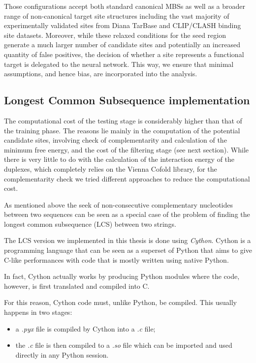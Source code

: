 Those configurations accept both standard canonical MBSs as well as a broader
range of non-canonical target site structures including the vast majority of experimentally validated sites from Diana TarBase and CLIP/CLASH binding site
datasets. Moreover, while these relaxed conditions for the seed region generate a much larger number of candidate sites and potentially an increased quantity of false positives, the decision of whether a site represents a functional target is delegated to the neural network. This way, we ensure that minimal assumptions, and hence bias, are incorporated into the analysis. 

\subsection{Longest Common Subsequence implementation}
The computational cost of the testing stage is considerably higher than that of the  training phase. The reasons lie mainly in the computation of the potential candidate sites, involving check of complementarity and calculation of the minimum free energy, and the cost of the filtering stage (see next section).    
While there is very little to do with the calculation of the interaction energy of the duplexes, which completely relies on the Vienna Cofold library, for the complementarity check we tried different approaches to reduce the computational cost.

As mentioned above the seek of non-consecutive complementary nucleotides between two sequences can be seen as a special case of the problem of finding the longest common subsequence (LCS) between two strings. 

The LCS version we implemented in this thesis is done using \emph{Cython}\cite{cython}. Cython is a programming language that can be seen as a superset of Python that aims to give C-like performances with code that is mostly written using native Python. 

In fact, Cython actually works by producing Python modules where the code, however, is first translated and compiled into C.

For this reason, Cython code must, unlike Python, be compiled. This usually happens in two stages: 

\begin{itemize}
	\item a \emph{.pyx} file is compiled by Cython into a \emph{.c} file;
	\item the \emph{.c} file is then compiled to a \emph{.so} file which can be imported and used directly in any Python session. 
\end{itemize}   

